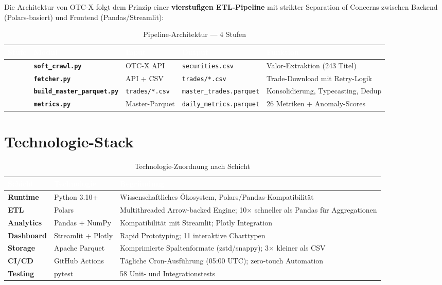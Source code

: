 \documentclass[12pt, a4paper, oneside]{report}
\newcommand{\code}[1]{\texttt{\small\textcolor{darknavy}{#1}}}
\begin{document}
Die Architektur von OTC-X folgt dem Prinzip einer \textbf{vierstufigen ETL-Pipeline} mit strikter Separation of Concerns zwischen Backend (Polars-basiert) und Frontend (Pandas/Streamlit):

\begin{table}[H]
\centering
\caption{Pipeline-Architektur — 4 Stufen}
\begin{tabularx}{\textwidth}{>{\centering\arraybackslash}p{1cm} >{\bfseries\sffamily}p{3.5cm} p{3cm} p{3.5cm} X}
  \toprule
  \rowcolor{darknavy} \textcolor{white}{Stufe} & \textcolor{white}{Modul} & \textcolor{white}{Input} & \textcolor{white}{Output} & \textcolor{white}{Funktion} \\
  \midrule
  1 & \code{soft\_crawl.py}           & OTC-X API          & \code{securities.csv}          & Valor-Extraktion (243 Titel) \\
  2 & \code{fetcher.py}              & API + CSV           & \code{trades/*.csv}            & Trade-Download mit Retry-Logik \\
  3 & \code{build\_master\_parquet.py} & \code{trades/*.csv} & \code{master\_trades.parquet}  & Konsolidierung, Typecasting, Dedup \\
  4 & \code{metrics.py}              & Master-Parquet      & \code{daily\_metrics.parquet}  & 26 Metriken + Anomaly-Scores \\
  \bottomrule
\end{tabularx}
\end{table}

\section{Technologie-Stack}

\begin{table}[H]
\centering
\caption{Technologie-Zuordnung nach Schicht}
\begin{tabularx}{\textwidth}{>{\bfseries\sffamily}p{2.5cm} p{3.5cm} X}
  \toprule
  \rowcolor{darknavy} \textcolor{white}{Schicht} & \textcolor{white}{Technologie} & \textcolor{white}{Begründung} \\
  \midrule
  Runtime     & Python 3.10+   & Wissenschaftliches Ökosystem, Polars/Pandas-Kompatibilität \\
  ETL         & Polars         & Multithreaded Arrow-backed Engine; 10× schneller als Pandas für Aggregationen \\
  Analytics   & Pandas + NumPy & Kompatibilität mit Streamlit; Plotly Integration \\
  Dashboard   & Streamlit + Plotly & Rapid Prototyping; 11 interaktive Charttypen \\
  Storage     & Apache Parquet & Komprimierte Spaltenformate (zstd/snappy); 3× kleiner als CSV \\
  CI/CD       & GitHub Actions & Tägliche Cron-Ausführung (05:00 UTC); zero-touch Automation \\
  Testing     & pytest         & 58 Unit- und Integrationstests \\
  \bottomrule
\end{tabularx}
\end{table}
\end{document}
